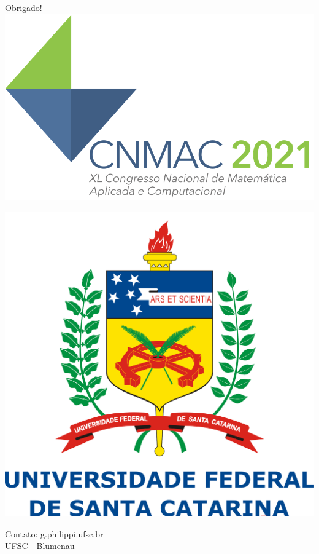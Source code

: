 \documentclass[10pt]{beamer}
\theoremstyle{plain}
\theoremstyle{definition}
\begin{document}
	\begin{frame}
		\begin{center}
			\vspace{1.5cm}
			Obrigado!\\
			\hspace{-4.5cm}
			\includegraphics[scale=0.2]{logo.png}
			
			\vspace{-2.7cm}
			\hspace{5.5cm}
			\includegraphics[scale=0.038]{logo_ufsc.png}
			
			\vspace{0.5cm}
			Contato: g.philippi\@grad.ufsc.br\\ UFSC - Blumenau
		\end{center}
	\end{frame}
	
\end{document}
